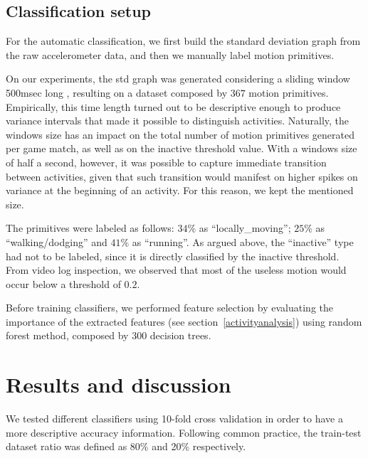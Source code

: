 \subsection{Classification setup}

For the automatic classification, we first build the standard deviation graph from the raw accelerometer data, and then we manually label motion primitives. 

On our experiments, the std graph was generated considering a sliding window 500msec long %
, resulting on a dataset composed by $367$ motion primitives. Empirically, this time length turned out to be descriptive enough to produce variance intervals that made it possible to distinguish activities. Naturally, the windows size has an impact on the total number of motion primitives generated per game match, as well as on the inactive threshold value. With a windows size of half a second, however, it was possible to capture immediate transition between activities, given that such transition would manifest on higher spikes on variance at the beginning of an activity. For this reason, we kept the mentioned size. 

The primitives were labeled as follows: $34\%$ as ``locally\_moving''; $25\%$ as ``walking/dodging'' and $41\%$ as ``running''.%
As argued above, the ``inactive'' type had not to be labeled, since it is directly classified by the inactive threshold. From video log inspection, we observed that most of the useless motion would occur below a threshold of $0.2$.

Before training classifiers, we performed feature selection by evaluating the importance of the extracted features (see section~\ref{activityanalysis}) using random forest method, composed by 300 decision trees.%

\section{Results and discussion}\label{discussion}

We tested different classifiers using 10-fold cross validation in order to have a more descriptive accuracy information. Following common practice, the train-test dataset ratio was defined as 80\% and 20\% respectively.

